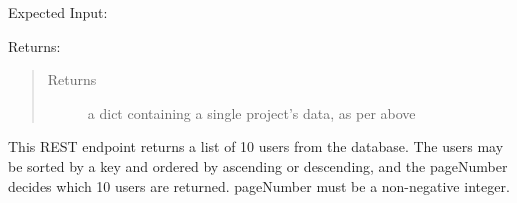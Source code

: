 \documentclass[letterpaper,10pt,english]{sphinxmanual}
\begin{document}
\begin{fulllineitems}
\begin{fulllineitems}
Expected Input:

\begin{sphinxVerbatim}[commandchars=\\\{\}]
     
\end{sphinxVerbatim}

Returns:

\begin{sphinxVerbatim}[commandchars=\\\{\}]
       
     
     
     
     
     
     
\end{sphinxVerbatim}
\begin{quote}\begin{description}
\item[{Returns}] \leavevmode
a dict containing a single project’s data, as per above

\end{description}\end{quote}

\end{fulllineitems}


\begin{fulllineitems}
\label{\detokenize{apidoc/utdesign_procurement:utdesign_procurement.apigateway.ApiGateway.userSpreadsheetData}}
This REST endpoint returns a list of 10 users from the database. The users may be
sorted by a key and ordered by ascending or descending, and the pageNumber
decides which 10 users are returned. pageNumber must be a non-negative integer.


\end{fulllineitems}
\end{fulllineitems}
\end{document}
